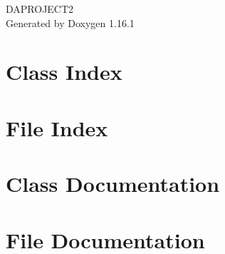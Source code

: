 \documentclass[twoside]{book}
\newcommand{\+}{\discretionary{\mbox{\scriptsize$\hookleftarrow$}}{}{}}
\newcommand{\clearemptydoublepage}{%
    \newpage{\pagestyle{empty}\cleardoublepage}%
  }
\begin{document}
  \raggedbottom
    \hypersetup{pageanchor=false,
                bookmarksnumbered=true,
                pdfencoding=unicode
               }
  \begin{titlepage}
  \vspace*{7cm}
  \begin{center}%
  {\Large DAPROJECT2}\\
  \vspace*{1cm}
  {\large Generated by Doxygen 1.16.1}\\
  \end{center}
  \end{titlepage}
  \clearemptydoublepage
  \tableofcontents
  \clearemptydoublepage
  \hypersetup{pageanchor=true}
\chapter{Class Index}

\chapter{File Index}

\chapter{Class Documentation}












\chapter{File Documentation}



















  \backmatter
  \newpage
  \clearemptydoublepage
  \printindex
\end{document}
